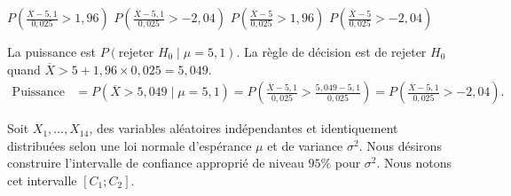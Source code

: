 \begin{questions}
\begin{parts}
\begin{checkboxes}
    \choice $P\left(\displaystyle \frac{\overline{X}-5,1}{0,025}>1,96\right)$
    \correctchoice $P\left(\displaystyle \frac{\overline{X}-5,1}{0,025}>-2,04\right)$
    \choice $P\left(\displaystyle \frac{\overline{X}-5}{0,025}>1,96\right)$
    \choice $P\left(\displaystyle \frac{\overline{X}-5}{0,025}>-2,04\right)$
\end{checkboxes}

\begin{solution}
La puissance est $P(\text{rejeter }H_0\mid\mu=5{,}1)$. La règle de décision est de rejeter $H_0$ quand $\overline{X}>5+1{,}96\times 0{,}025=5{,}049$.
\begin{align*}
\text{Puissance}&=P(\overline{X}>5{,}049\mid\mu=5{,}1)
=P\!\left(\frac{\overline{X}-5{,}1}{0{,}025}>\frac{5{,}049-5{,}1}{0{,}025}\right)
=P\!\left(\frac{\overline{X}-5{,}1}{0{,}025}>-2{,}04\right).
\end{align*}
\end{solution}

\end{parts}


\pageblanche
 \question Soit $X_1,\hdots, X_{14}$, des variables aléatoires indépendantes et identiquement distribuées selon une loi normale d’espérance $\mu$ et de variance $\sigma^2$. 
Nous désirons construire l'intervalle de confiance approprié de niveau $95\%$ pour $\sigma^2$. Nous notons cet intervalle $[C_1;C_2]$.
\end{questions}
